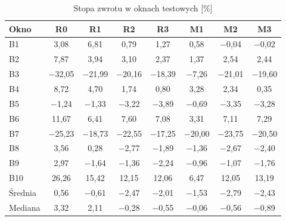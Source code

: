 \begin{table}[ht]
\centering
\caption{Stopa zwrotu w oknach testowych [\%]}
\label{tab:wyniki-okna}
\small
\begin{tabular}{|l|c|c|c|c|c|c|c|}
\hline
\textbf{Okno} & \textbf{R0} & \textbf{R1} & \textbf{R2} & \textbf{R3} & \textbf{M1} & \textbf{M2} & \textbf{M3} \\ \hline
B1 & 3{,}08 & 6{,}81 & 0{,}79 & 1{,}27 & 0{,}58 & $-$0{,}04 & $-$0{,}02 \\ \hline
B2 & 7{,}87 & 3{,}94 & 3{,}10 & 2{,}37 & 1{,}37 & 2{,}54 & 2{,}44 \\ \hline
B3 & $-$32{,}05 & $-$21{,}99 & $-$20{,}16 & $-$18{,}39 & $-$7{,}26 & $-$21{,}01 & $-$19{,}60 \\ \hline
B4 & 8{,}72 & 4{,}70 & 1{,}74 & 0{,}80 & 3{,}28 & 2{,}34 & 0{,}35 \\ \hline
B5 & $-$1{,}24 & $-$1{,}33 & $-$3{,}22 & $-$3{,}89 & $-$0{,}69 & $-$3{,}35 & $-$3{,}28 \\ \hline
B6 & 11{,}67 & 6{,}41 & 7{,}60 & 7{,}08 & 3{,}31 & 7{,}11 & 7{,}29 \\ \hline
B7 & $-$25{,}23 & $-$18{,}73 & $-$22{,}55 & $-$17{,}25 & $-$20{,}00 & $-$23{,}75 & $-$20{,}50 \\ \hline
B8 & 3{,}56 & 0{,}28 & $-$2{,}77 & $-$1{,}89 & $-$1{,}36 & $-$2{,}67 & $-$2{,}40 \\ \hline
B9 & 2{,}97 & $-$1{,}64 & $-$1{,}36 & $-$2{,}24 & $-$0{,}96 & $-$1{,}07 & $-$1{,}76 \\ \hline
B10 & 26{,}26 & 15{,}42 & 12{,}15 & 12{,}06 & 6{,}47 & 12{,}05 & 13{,}19 \\ \hline
Średnia & 0{,}56 & $-$0{,}61 & $-$2{,}47 & $-$2{,}01 & $-$1{,}53 & $-$2{,}79 & $-$2{,}43 \\ \hline
Mediana & 3{,}32 & 2{,}11 & $-$0{,}28 & $-$0{,}55 & $-$0{,}06 & $-$0{,}56 & $-$0{,}89 \\ \hline
\end{tabular}
\end{table}

